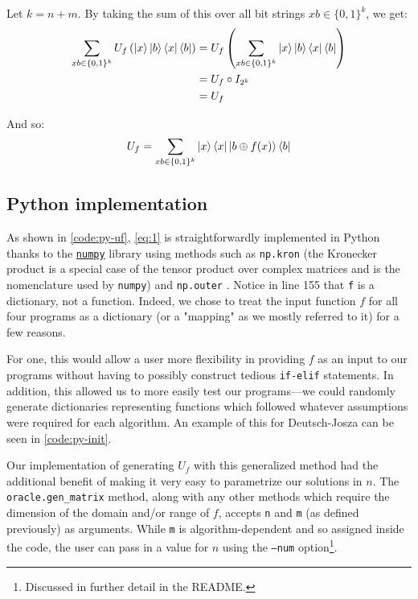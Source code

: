 \documentclass[12pt]{article}
\begin{document}
Let $k = n+m$. By taking the sum of this over all bit strings $xb \in \{0,1\}^k$, we get:
\begin{align*}
    \sum_{xb \in \{0,1\}^{k}}U_f\left(\ket{x}\ket{b}\bra{x}\bra{b}\right)
        &= U_f \left(\sum_{xb \in \{0,1\}^{k}}\ket{x}\ket{b}\bra{x}\bra{b}\right) \\
        &= U_f \circ I_{2^{k}} \\
        &= U_f
\end{align*}

And so:
\begin{equation}\label{eq:1}
        U_f = \sum_{xb \in \{0,1\}^{k}}\ket{x}\bra{x} \ket{b \oplus f(x)}\bra{b}
\end{equation}

\subsection{Python implementation}

As shown in \autoref{code:py-uf}, \autoref{eq:1} is straightforwardly implemented in Python thanks to the \href{https://numpy.org/}{\texttt{numpy}} library using methods such as \texttt{np.kron} (the Kronecker product is a special case of the tensor product over complex matrices and is the nomenclature used by \texttt{numpy}) and \texttt{np.outer} \cite{numpy}.
Notice in line 155 that \texttt{f} is a dictionary, not a function.
Indeed, we chose to treat the input function $f$ for all four programs as a dictionary (or a "mapping" as we mostly referred to it) for a few reasons.

For one, this would allow a user more flexibility in providing $f$ as an input to our programs without having to possibly construct tedious \texttt{if-elif} statements.
In addition, this allowed us to more easily test our programs---we could randomly generate dictionaries representing functions which followed whatever assumptions were required for each algorithm.
An example of this for Deutsch-Josza can be seen in \autoref{code:py-init}.

Our implementation of generating $U_f$ with this generalized method had the additional benefit of making it very easy to parametrize our solutions in $n$.
The \texttt{oracle.gen\_matrix} method, along with any other methods which require the dimension of the domain and/or range of $f$, accepts \texttt{n} and \texttt{m} (as defined previously) as arguments.
While \texttt{m} is algorithm-dependent and so assigned inside the code, the user can pass in a value for $n$ using the \texttt{--num} option\footnote{Discussed in further detail in the README.}.
\end{document}
